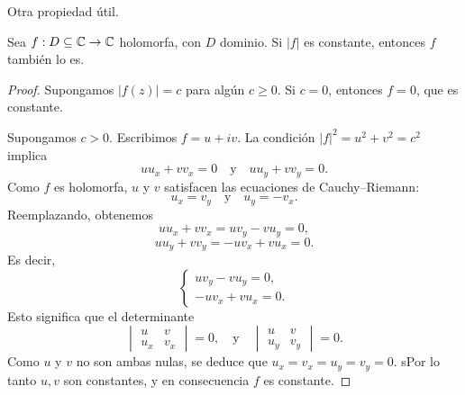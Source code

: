 Otra propiedad útil.

\begin{proposition}
    Sea $f : D \subseteq \mathbb{C} \to \mathbb{C}$ holomorfa, con $D$ dominio. 
    Si $|f|$ es constante, entonces $f$ también lo es.
\end{proposition}

\begin{proof}
    Supongamos $|f(z)| = c$ para algún $c \geq 0$.  
    Si $c = 0$, entonces $f = 0$, que es constante.  

    Supongamos $c > 0$. Escribimos $f = u + iv$. La condición $|f|^2 = u^2+v^2 = c^2$ implica
    \begin{equation*}
        u u_x + v v_x = 0
        \quad\text{y}\quad
        u u_y + v v_y = 0.
    \end{equation*}
    Como $f$ es holomorfa, $u$ y $v$ satisfacen las ecuaciones de Cauchy–Riemann:
    \begin{equation*}
        u_x = v_y \quad\text{y}\quad u_y = -v_x.
    \end{equation*}
    Reemplazando, obtenemos
    \begin{equation*}
        u u_x + v v_x = u v_y - v u_y = 0,
    \end{equation*}
    \begin{equation*}
        u u_y + v v_y = -u v_x + v u_x = 0.
    \end{equation*}
    Es decir,
    \begin{equation*}
        \begin{cases}
            u v_y - v u_y = 0, \\
            -u v_x + v u_x = 0.
        \end{cases}
    \end{equation*}
    Esto significa que el determinante
    \begin{equation*}
        \begin{vmatrix}
            u & v \\
            u_x & v_x
        \end{vmatrix}
        = 0,
        \quad\text{y}\quad
        \begin{vmatrix}
            u & v \\
            u_y & v_y
        \end{vmatrix}
        = 0.
    \end{equation*}
    Como $u$ y $v$ no son ambas nulas, se deduce que $u_x=v_x=u_y=v_y=0$. sPor lo tanto $u,v$ son constantes, y en consecuencia $f$ es constante.
\end{proof}

